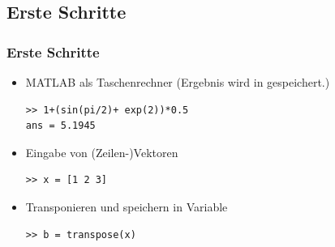 \documentclass[hyperref={xetex}]{beamer}
\begin{document}
\subsection{Erste Schritte}
\begin{frame}[fragile]\frametitle{Erste Schritte}
\begin{itemize}
\item MATLAB als Taschenrechner \newline (Ergebnis wird in  gespeichert.) 
\begin{lstlisting}
>> 1+(sin(pi/2)+ exp(2))*0.5
ans = 5.1945
\end{lstlisting}
\item Eingabe von (Zeilen-)Vektoren
\begin{lstlisting}
>> x = [1 2 3]  
\end{lstlisting}
\item Transponieren und speichern in  Variable 
\begin{lstlisting}
>> b = transpose(x)
\end{lstlisting}
\end{itemize}
\end{frame}
\end{document}
